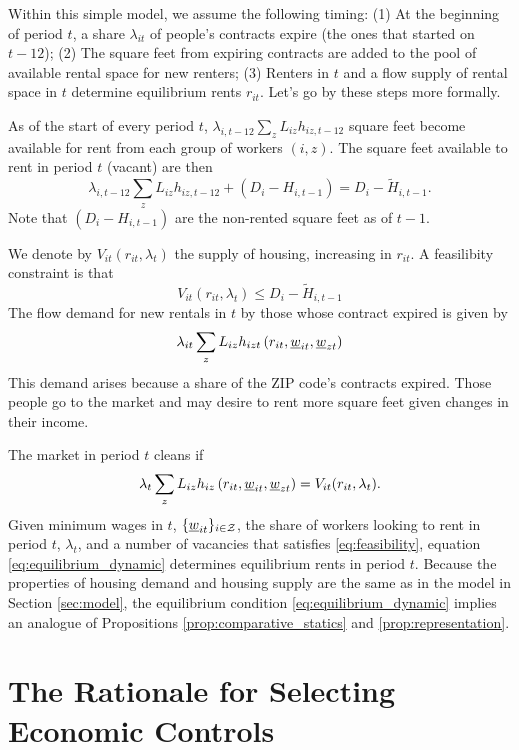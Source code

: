 Within this simple model, we assume the following timing: 
(1) At the beginning of period $t$, a share $\lambda_{it}$ of people's contracts 
expire (the ones that started on $t-12$);
(2) The square feet from expiring contracts are added to the pool of available 
rental space for new renters;
(3) Renters in $t$ and a flow supply of rental space in $t$ determine equilibrium 
rents $r_{it}$.
Let's go by these steps more formally.

As of the start of every period $t$, $\lambda_{i,t-12} \sum_z L_{iz} h_{iz,t-12}$ 
square feet become available for rent from each group of workers $(i,z)$.
The square feet available to rent in period $t$ (vacant) are then
$$
\lambda_{i,t-12} \sum_z L_{iz} h_{iz,t-12} + (D_i - H_{i,t-1}) = D_i - \tilde H_{i,t-1}.
$$
Note that $(D_i - H_{i,t-1})$ are the non-rented square feet as of $t-1$.

We denote by $V_{it}(r_{it}, \lambda_t)$ the supply of housing, increasing in 
$r_{it}$.
A feasilibity constraint is that 
\begin{equation}\label{eq:feasibility}
	V_{it}(r_{it}, \lambda_t) \leq D_i - \tilde H_{i,t-1}
\end{equation}
The flow demand for new rentals in $t$ by those whose contract expired is given by
$$
\lambda_{it} \sum_z L_{iz} h_{izt} \left(r_{it}, \underline{w}_{it}, \underline{w}_{zt} \right)
$$
This demand arises because a share of the ZIP code's contracts expired. 
Those people go to the market and may desire to rent more square feet given changes 
in their income.

The market in period $t$ cleans if
\begin{equation}\label{eq:equilibrium_dynamic}
	\lambda_t \sum_z L_{iz} h_{iz} \left(r_{it}, \underline{w}_{it}, \underline{w}_{zt} \right) = 
	V_{it}(r_{it}, \lambda_t) .
\end{equation}
Given minimum wages in $t$, $\{\underline{w}_{it}\}_{i\in\mathcal{Z}}$,
the share of workers looking to rent in period $t$, $\lambda_t$, 
and a number of vacancies that satisfies \eqref{eq:feasibility}, 
equation \eqref{eq:equilibrium_dynamic} determines equilibrium rents in period $t$.
Because the properties of housing demand and housing supply are the same as in the
model in Section \ref{sec:model},
the equilibrium condition \eqref{eq:equilibrium_dynamic} implies an analogue of 
Propositions \ref{prop:comparative_statics} and \ref{prop:representation}.

\clearpage
\section{The Rationale for Selecting Economic Controls}\label{sec:app_econ_control}

